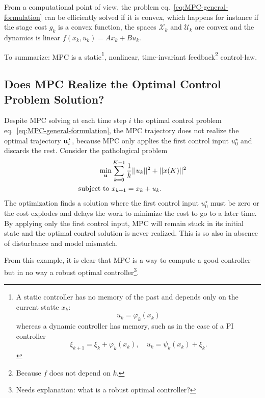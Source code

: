 From a computational point of view, the problem eq.~\eqref{eq:MPC-general-formulation} can be efficiently solved if it is convex, which happens for instance if the stage cost $g_k$ is a convex function, the spaces $\mathcal{X}_k$ and $\mathcal{U}_k$ are convex and the dynamics is linear $f(x_k,u_k)=Ax_k+Bu_k$.


To summarize: MPC is a static\footnote{A static controller has no memory of the past and depends only on the current statte $x_k$:
  \begin{equation*}
    u_k = \varphi_k(x_k)
  \end{equation*}
  whereas a dynamic controller has memory, such as in the case of a
  PI controller
  \begin{equation*}
    \xi_{k+1} = \xi_k + \varphi_k(x_k),\quad u_k = \psi_k(x_k) + \xi_k.
  \end{equation*}}, nonlinear, time-invariant feedback\footnote{Because $f$ does not depend on $k$.} control-law.


\subsection{Does MPC Realize the Optimal Control Problem Solution?}
\label{sec:MPC-not-an-optimal-control-solver}

Despite MPC solving at each time step $i$ the optimal control problem eq.~\eqref{eq:MPC-general-formulation}, the MPC trajectory does not realize the optimal trajectory $\boldsymbol{\mathrm{u}}_i^\star$, because MPC only applies the first control input $u_0^\star$ and discards the rest. Consider the pathological problem
\begin{align*}
  \min_{\boldsymbol{\mathrm{u}}} & \sum_{k=0}^{K-1}\frac {1}{k}||u_k||^2 + ||x(K)||^2\\
  \text{subject to } &x_{k+1} = x_k+u_k.
\end{align*}
The optimization finds a solution where the first control input $u_0^\star$ must be zero or the cost explodes and delays the work to minimize the cost to go to a later time. By applying only the first control input, MPC will remain stuck in its initial state and the optimal control solution is never realized. This is so also in absence of disturbance and model mismatch.

From this example, it is clear that MPC is a way to compute a good controller but in no way a robust optimal controller\footnote{Needs explanation: what is a robust optimal controller?}.

